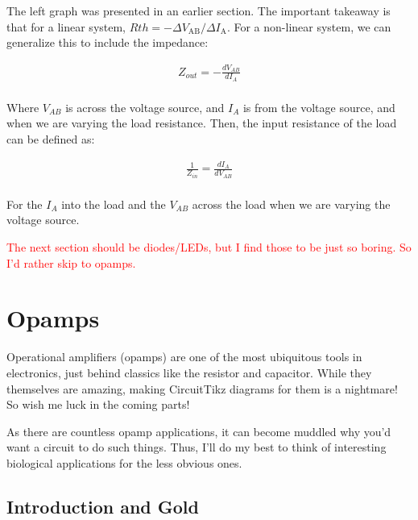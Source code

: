 \documentclass[12pt]{report}
\begin{document}
The left graph was presented in an earlier section. The important takeaway is that for a linear system, $R{th} = -\Delta V_{\mathrm{AB}}/\Delta I_{\mathrm{A}}$. For a non-linear system, we can generalize this to include the impedance: 


\begin{equation} \label{out}
\begin{split}
Z_{out} = -\frac{dV_{AB}}{dI_A}\\
\end{split}
\end{equation}

Where $V_{AB}$ is across the voltage source, and $I_A$ is from the voltage source, and when we are varying the load resistance. Then, the input resistance of the load can be defined as: 


\begin{equation} \label{in}
\begin{split}
\frac{1}{Z_{in}} = \frac{dI_{A}}{dV_{AB}}\\
\end{split}
\end{equation}

For the $I_A$ into the load and the $V_{AB}$ across the load when we are varying the voltage source. 


\textcolor{red}{The next section should be diodes/LEDs, but I find those to be just so boring. So I'd rather skip to opamps.}

\vfill

\chapter{Opamps}

Operational amplifiers (opamps) are one of the most ubiquitous tools in electronics, just behind classics like the resistor and capacitor. While they themselves are amazing, making CircuitTikz diagrams for them is a nightmare! So wish me luck in the coming parts!\newline

As there are countless opamp applications, it can become muddled why you'd want a circuit to do such things. Thus, I'll do my best to think of interesting biological applications for the less obvious ones. 

\section{Introduction and Gold}
\end{document}
